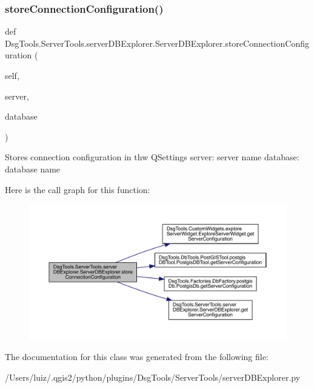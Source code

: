 \subsubsection{\texorpdfstring{store\+Connection\+Configuration()}{storeConnectionConfiguration()}}
{\footnotesize\ttfamily def Dsg\+Tools.\+Server\+Tools.\+server\+D\+B\+Explorer.\+Server\+D\+B\+Explorer.\+store\+Connection\+Configuration (\begin{DoxyParamCaption}\item[{}]{self,  }\item[{}]{server,  }\item[{}]{database }\end{DoxyParamCaption})}

\begin{DoxyVerb}Stores connection configuration in thw QSettings
server: server name
database: database name
\end{DoxyVerb}
 Here is the call graph for this function\+:
\nopagebreak
\begin{figure}[H]
\begin{center}
\leavevmode
\includegraphics[width=350pt]{class_dsg_tools_1_1_server_tools_1_1server_d_b_explorer_1_1_server_d_b_explorer_acae0951876db614c0491d8e83be71bff_cgraph}
\end{center}
\end{figure}


The documentation for this class was generated from the following file\+:\begin{DoxyCompactItemize}
\item 
/\+Users/luiz/.\+qgis2/python/plugins/\+Dsg\+Tools/\+Server\+Tools/server\+D\+B\+Explorer.\+py\end{DoxyCompactItemize}
